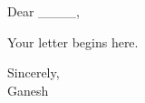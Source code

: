 \documentclass[12pt]{article}
\date{\today}
\begin{document}
\raggedright

{\small\the\year}

\bigskip

Dear \_\_\_\_,

\bigskip

Your letter begins here.

\bigskip

Sincerely,\\
Ganesh
\end{document}
